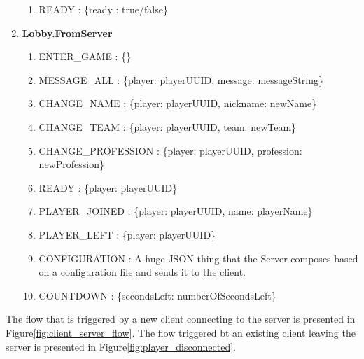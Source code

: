 \begin{enumerate}
\begin{enumerate}
	\item READY :
	\{ready : true/false\}    
     
  \end{enumerate}
  
  
  \item \textbf{Lobby.FromServer}
  
  \begin{enumerate}
    	\item ENTER\_GAME :
    	\{\}
		
		\item MESSAGE\_ALL :
		\{player: playerUUID, message: messageString\}
		
		\item CHANGE\_NAME :
		\{player: playerUUID, nickname: newName\}
		
		\item CHANGE\_TEAM :
		\{player: playerUUID, team: newTeam\}
				
		\item CHANGE\_PROFESSION :
		\{player: playerUUID, profession: newProfession\}
		
		\item READY :
		\{player: playerUUID\}
										
		\item PLAYER\_JOINED :
		\{player: playerUUID, name: playerName\}
		
		\item PLAYER\_LEFT :
		\{player: playerUUID\}
			
		\item CONFIGURATION :
		A huge JSON thing that the Server composes based on a configuration file and
		sends it to the client. 
		
		\item COUNTDOWN :
		\{secondsLeft: numberOfSecondsLeft\}
		
  \end{enumerate}  
  
\end{enumerate}

The flow that is triggered by a new client connecting to the server is
presented in Figure\ref{fig:client_server_flow}. The flow triggered bt an existing client leaving the
server is presented in Figure\ref{fig:player_disconnected}.


